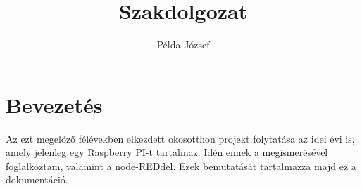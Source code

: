 \documentclass[a4paper,12pt,oneside]{report}
\begin{document}
\pagestyle{fancy}
\fancyhead[]{}
\fancyhead[C]{\thepage}
\fancyfoot[]{}
\fancyfoot[]{}
\renewcommand{\headrulewidth}{0pt}
\renewcommand{\footrulewidth}{0pt}




\title{Szakdolgozat}

\author{Példa József}

\date{}

\maketitle

\tableofcontents

\chapter{Bevezetés}

Az ezt megelőző félévekben elkezdett okosotthon projekt folytatása az idei évi is, amely jelenleg egy Raspberry PI-t tartalmaz.
Idén ennek a megismerésével foglalkoztam, valamint a node-REDdel. Ezek bemutatását tartalmazza majd ez a dokumentáció.



\end{document}
